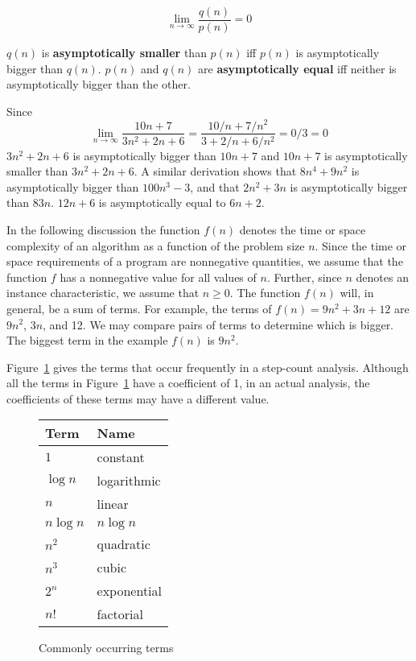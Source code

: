 \begin{equation}\label{Eqn2:bigger}
\lim_{n\rightarrow\infty} \frac{q(n)}{p(n)} = 0 
\end{equation}


$q(n)$ is {\bf asymptotically smaller} than $p(n)$ iff $p(n)$
is asymptotically
bigger than $q(n)$. $p(n)$ and $q(n)$ are {\bf asymptotically equal}
iff neither is asymptotically bigger than the other.

\begin{example}\label{E2:bigger}
Since
\[
\lim_{n\rightarrow\infty} \frac{10n+7}{3n^2+2n+6}
= \frac{10/n + 7/n^2}{3+2/n+6/n^2} = 0/3 = 0 \]
$3n^2+2n+6$ is asymptotically bigger than $10n+7$ and $10n+7$ is
asymptotically smaller than
$3n^2+2n+6$.
A similar derivation shows that $8n^4 + 9n^2$ is
asymptotically bigger than
$100n^3 - 3$, and that $2n^2 + 3n$ is asymptotically bigger
than $83n$.
$12n+6$ is asymptotically equal to $6n+2$.
\end{example}

In the following discussion the function $f(n)$ denotes
the time or space complexity of an algorithm as a function
of the problem size $n$.
Since the time or space requirements of a program are nonnegative quantities,
we assume that the function $f$ has a nonnegative value for all values of $n$.
Further, since $n$ denotes an instance characteristic,
we assume that $n \geq 0$.
The function $f(n)$ will, in general, be a sum of terms.
For example, the terms of $f(n) = 9n^2 + 3n +12$ are
$9n^2$, $3n$, and 12. We may compare pairs of terms
to determine which is bigger.
The biggest term in the example $f(n)$ is $9n^2$.

Figure~\ref{fig2:functions} gives the terms that occur
frequently in a step-count analysis.
Although all the terms in Figure~\ref{fig2:functions} have a coefficient of 1,
in an actual analysis, the coefficients of these terms may have a different value.

\begin{figure}
\begin{center}
\begin{tabular}{| l | l |}
Term  &  Name\\ \hline
$1$  &  constant\\
$\log n$  &  logarithmic\\
$n$  &  linear\\
$n \log n$  &  $n \log n$\\
$n^2$  &  quadratic\\
$n^3$  &  cubic\\
$2^n$  &  exponential\\
$n !$  &  factorial\\
\end{tabular}
\end{center}
\caption{Commonly occurring terms
\label{fig2:functions}}
\end{figure}

